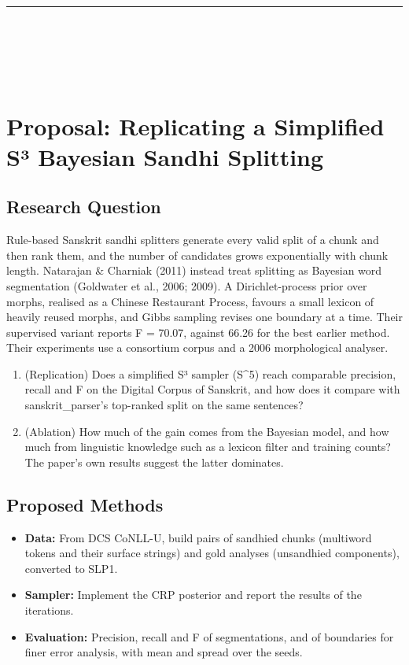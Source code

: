 \documentclass[11pt,a4paper]{article}
\begin{document}
\vspace{1em}
\hrule
\vspace{2em}

\\ \\ \\ \\ 



\section{Proposal: Replicating a Simplified S³ Bayesian Sandhi Splitting}

\subsection{Research Question}
Rule-based Sanskrit sandhi splitters generate every valid split of a chunk and then rank them, and the number of candidates grows exponentially with chunk length. Natarajan & Charniak (2011) instead treat splitting as Bayesian word segmentation (Goldwater et al., 2006; 2009). A Dirichlet-process prior over morphs, realised as a Chinese Restaurant Process, favours a small lexicon of heavily reused morphs, and Gibbs sampling revises one boundary at a time. Their supervised variant reports F = 70.07, against 66.26 for the best earlier method. Their experiments use a consortium corpus and a 2006 morphological analyser.

\begin{enumerate}
    \item (Replication) Does a simplified S³ sampler (S^5) reach comparable precision, recall and F on the Digital Corpus of Sanskrit, and how does it compare with sanskrit\_parser's top-ranked split on the same sentences?
    \item (Ablation) How much of the gain comes from the Bayesian model, and how much from linguistic knowledge such as a lexicon filter and training counts? The paper's own results suggest the latter dominates.
\end{enumerate}

\subsection{Proposed Methods}
\begin{itemize}
    \item \textbf{Data:} From DCS CoNLL-U, build pairs of sandhied chunks (multiword tokens and their surface strings) and gold analyses (unsandhied components), converted to SLP1. 
    \item \textbf{Sampler:} Implement the CRP posterior and report the results of the iterations.
    \item \textbf{Evaluation:} Precision, recall and F of segmentations, and of boundaries for finer error analysis, with mean and spread over the seeds. 
\end{itemize}
\end{document}
